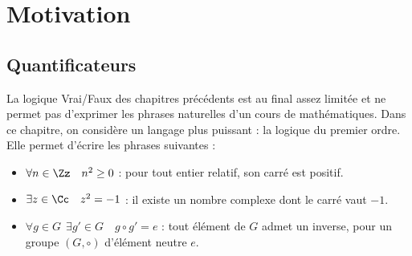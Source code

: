 \documentclass[11pt,class=report,crop=false]{standalone}
\begin{document}











\section{Motivation}


\subsection{Quantificateurs}


La logique Vrai/Faux des chapitres précédents est au final assez limitée et ne permet pas d'exprimer les phrases naturelles d'un cours de mathématiques.
Dans ce chapitre, on considère un langage plus puissant : la logique du premier ordre. Elle permet d'écrire les phrases suivantes :
\begin{itemize}
	\item \og{}$\forall n \in \Zz \quad  n^2 \ge 0$\fg{} : \og{}pour tout entier relatif, son carré est positif\fg{}.
	
	\item \og{}$\exists z \in \Cc \quad  z^2 = -1$\fg{} : \og{}il existe un nombre complexe dont le carré vaut $-1$\fg{}. 
	
	\item \og{}$\forall g \in G \ \ \exists g' \in G \quad  g \circ g' = e$\fg{} : \og{}tout élément de $G$ admet un inverse\fg{}, pour un groupe $(G,\circ)$ d'élément neutre $e$.
\end{itemize}
\end{document}
